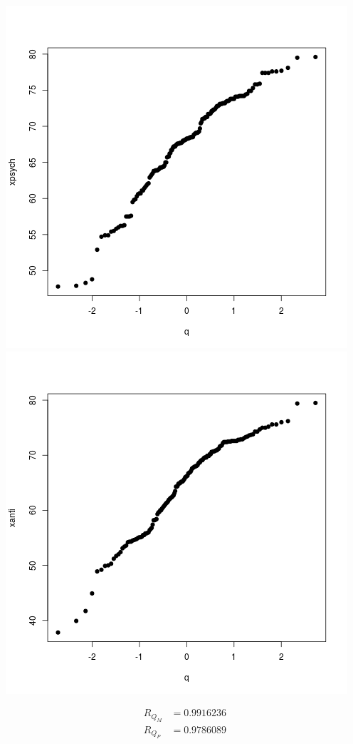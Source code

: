 \documentclass[letterpaper,10pt]{article}
\begin{document}
\begin{enumerate}
\begin{center}
\includegraphics[scale=.33]{newpsychq.png}
\includegraphics[scale=.33]{newantiq.png}
\end{center}
\begin{align*}
R_{Q_M} &= 0.9916236\\
R_{Q_P} &= 0.9786089\\

\end{align*}
\end{enumerate}
\end{document}
